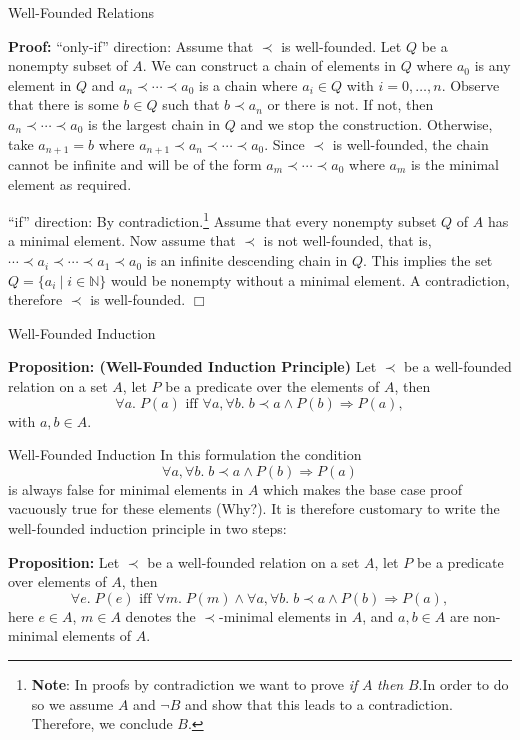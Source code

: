 \documentclass{beamer}
\begin{document}
\begin{frame}{Well-Founded Relations}

\small

{\bf Proof:} ``only-if'' direction: Assume that $\prec$ is well-founded. Let $Q$ be a nonempty subset of $A$.  We
can construct a chain of elements in $Q$ where $a_0$ is any element in $Q$ and
$a_n \prec \cdots \prec a_0$ is a chain where $a_i \in Q$ with $i = 0,\ldots,n$.
Observe that there is some $b \in Q$ such that $b \prec a_n$ or there is not.
If not, then $a_n \prec \cdots \prec a_0$ is the largest chain in $Q$ and we stop the construction. Otherwise,
take $a_{n+1} = b$ where $a_{n+1} \prec a_n \prec \cdots \prec a_0$.
Since $\prec$ is well-founded, the chain cannot be infinite and will be of the form
$a_m \prec \cdots \prec a_0$ where $a_m$ is the minimal element as required. 

\vspace{.1in}

``if'' direction:  By contradiction.\footnote{\tiny {\bf Note}: In proofs by contradiction we want to prove {\em if} $A$ {\em then} $B$.In order to do so we assume $A$ and $\neg B$ and show that this leads to a contradiction. Therefore, we conclude $B$.}
Assume that every nonempty subset $Q$ of $A$ has a minimal element.
Now assume that $\prec$ is not well-founded, that is, $\cdots \prec a_i \prec \cdots \prec a_1 \prec a_0$ is an infinite descending chain in $Q$.
This implies the set $Q = \{ a_i \:|\; i \in \mathbb{N}\}$ would be nonempty without a minimal element.
A contradiction, therefore $\prec$ is well-founded.
$\Box$
\end{frame}

\begin{frame}{Well-Founded Induction}

{\bf Proposition: (Well-Founded Induction Principle)} Let $\prec$ be a well-founded relation on a set $A$, let $P$ be a predicate over
the elements of $A$, then
\[
\forall a.\; P(a) \mbox{ iff } \forall a,\forall b.\; b\prec a \wedge P(b) \Rightarrow P(a),
\]
with $a,b\in A$.
\end{frame}

\begin{frame}{Well-Founded Induction}
\small
In this formulation the condition 
\[
\forall a,\forall b.\; b\prec a \wedge P(b) \Rightarrow P(a)
\]
is always false for minimal elements in $A$ which makes the base case proof vacuously true for these elements (Why?).  It is therefore
customary to write the well-founded induction principle in two steps:

\vspace{.1in}

{\bf Proposition:} Let $\prec$ be a well-founded relation on a set $A$, let $P$ be a predicate over elements of $A$, then
\[
\forall e.\; P(e) \mbox{ iff }\forall m.\; P(m) \wedge  \forall a,\forall b.\; b\prec a \wedge P(b) \Rightarrow P(a),
\]
here $e \in A$, $m\in A$ denotes the $\prec$-minimal elements in $A$, and $a,b\in A$ are non-minimal elements of $A$.
\end{frame}
\end{document}
